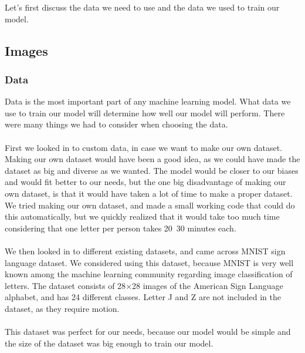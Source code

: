 \documentclass[../paper.tex]{subfiles}
\begin{document}
    Let's first discuss the data we need to use and the data we used to train our model.
    
    \subsection{Images}
    \subsubsection{Data}
    Data is the most important part of any machine learning model.
    What data we use to train our model will determine how well our model will perform. 
    There were many things we had to consider when choosing the data.\\
    \\
    First we looked in to custom data, in case we want to make our own dataset. 
    Making our own dataset would have been a good idea, 
    as we could have made the dataset as big and diverse as we wanted.
    The model would be closer to our biases and would fit better to our needs, 
    but the one big disadvantage of making our own dataset, is that it would have taken a lot of time to make a proper dataset.\\
    We tried making our own dataset, and made a small working code that could do this automatically, 
    but we quickly realized that it would take too much time considering that one letter per person takes 20~30 minutes each.\\
    \\
    We then looked in to different existing datasets, and came across MNIST sign language dataset\cite{d0}. 
    We considered using this dataset, because MNIST is very well known among the machine learning community regarding image classification of letters\cite{o0}.
    The dataset consists of 28$\times$28 images of the American Sign Language alphabet, 
    and has 24 different classes. 
    Letter J and Z are not included in the dataset, as they require motion.\\
    \\
    This dataset was perfect for our needs, because our model would be simple and the size of the dataset was big enough to train our model.
\end{document}
